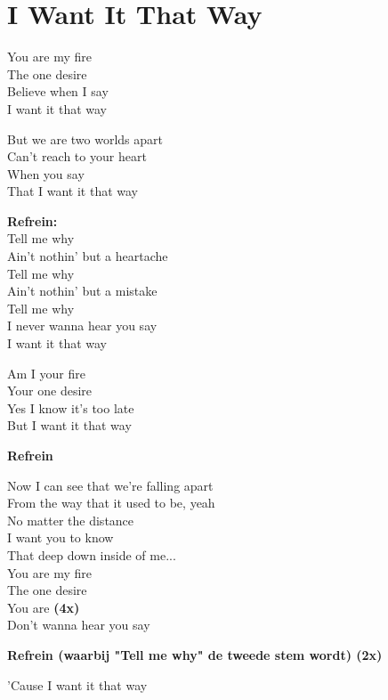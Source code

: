 \section{I Want It That Way}
You are my fire\\
The one desire\\
Believe when I say\\
I want it that way

But we are two worlds apart\\
Can’t reach to your heart\\
When you say\\
That I want it that way

\textbf{Refrein:}\\
Tell me why\\
Ain’t nothin’ but a heartache\\
Tell me why\\
Ain’t nothin’ but a mistake\\
Tell me why\\
I never wanna hear you say\\
I want it that way

Am I your fire\\
Your one desire\\
Yes I know it’s too late\\
But I want it that way

\textbf{Refrein}

Now I can see that we’re falling apart\\
From the way that it used to be, yeah\\
No matter the distance\\
I want you to know\\
That deep down inside of me...\\
You are my fire\\
The one desire\\
You are \textbf{(4x)}\\
Don’t wanna hear you say

\textbf{Refrein (waarbij "Tell me why" de tweede stem wordt) (2x)}

’Cause I want it that way
